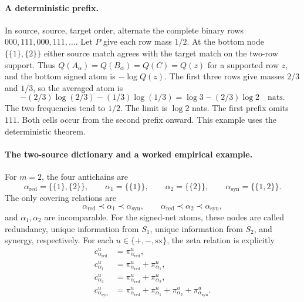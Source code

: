 \documentclass[11pt]{article}
\theoremstyle{definition}
\newcommand{\sx}{\mathrm{sx}}
\begin{document}
\paragraph{A deterministic prefix.} In source, source, target order, alternate the complete
binary rows $000,111,000,111,\ldots$. Let $P$ give each row mass $1/2$. At the bottom node
$\{\{1\},\{2\}\}$ either source match agrees with the target match on the two-row support.
Thus $Q(A_\alpha)=Q(B_\alpha)=Q(C)=Q(z)$ for a supported row $z$, and the bottom signed atom is $-\log Q(z)$. The first three rows give
masses $2/3$ and $1/3$, so the averaged atom is
\[
 -(2/3)\log(2/3)-(1/3)\log(1/3)=\log3-(2/3)\log2\quad\text{nats}.
\]
The two frequencies tend to $1/2$. The limit is $\log2$ nats. The first prefix omits $111$.
Both cells occur from the second prefix onward. This example uses the deterministic theorem.

\paragraph{The two-source dictionary and a worked empirical example.}
For $m=2$, the four antichains are
\[
  \alpha_{\mathrm{red}}=\{\{1\},\{2\}\},\qquad
  \alpha_1=\{\{1\}\},\qquad
  \alpha_2=\{\{2\}\},\qquad
  \alpha_{\mathrm{syn}}=\{\{1,2\}\}.
\]
The only covering relations are
\[
  \alpha_{\mathrm{red}}\prec\alpha_1\prec\alpha_{\mathrm{syn}},
  \qquad
  \alpha_{\mathrm{red}}\prec\alpha_2\prec\alpha_{\mathrm{syn}},
\]
and $\alpha_1,\alpha_2$ are incomparable.  For the signed-net atoms, these nodes are called
redundancy, unique information from $S_1$, unique information from $S_2$, and synergy,
respectively.  For each $u\in\{+,-,\sx\}$, the zeta relation is explicitly
\begin{align}
  c^u_{\alpha_{\mathrm{red}}}
    &=\pi^u_{\alpha_{\mathrm{red}}}, \\
  c^u_{\alpha_1}
    &=\pi^u_{\alpha_{\mathrm{red}}}+\pi^u_{\alpha_1}, \\
  c^u_{\alpha_2}
    &=\pi^u_{\alpha_{\mathrm{red}}}+\pi^u_{\alpha_2}, \\
  c^u_{\alpha_{\mathrm{syn}}}
    &=\pi^u_{\alpha_{\mathrm{red}}}+\pi^u_{\alpha_1}
      +\pi^u_{\alpha_2}+\pi^u_{\alpha_{\mathrm{syn}}}.
\end{align}
\end{document}
